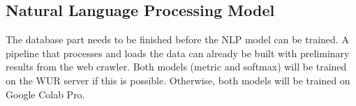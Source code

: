 \documentclass[a4paper, 12pt, oneside]{book} %
\begin{document}
\subsection{Natural Language Processing Model}
The database part needs to be finished before the NLP model can be trained.
A pipeline that processes and loads the data can already be built with preliminary results from the web crawler.
Both models (metric and softmax) will be trained on the WUR server if this is possible. 
Otherwise, both models will be trained on Google Colab Pro.


\printbibliography
\end{document}
